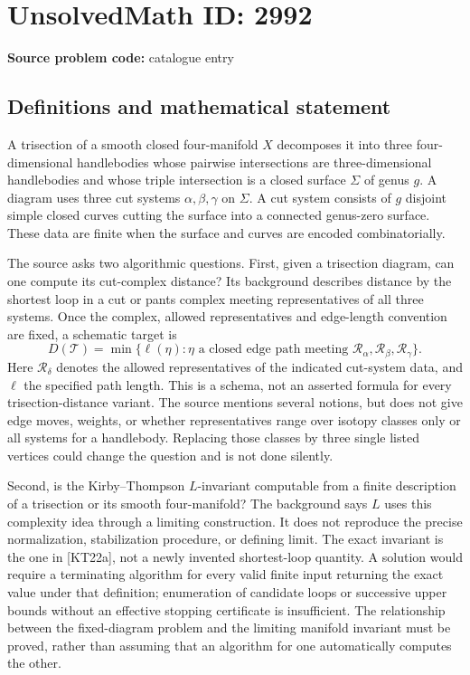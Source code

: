 \documentclass[11pt]{article}
\begin{document}
\section*{UnsolvedMath ID: 2992}
\textbf{Source problem code:} catalogue entry
\subsection{Definitions and mathematical statement}
A trisection of a smooth closed four-manifold $X$ decomposes it into three four-dimensional handlebodies whose pairwise intersections are three-dimensional handlebodies and whose triple intersection is a closed surface $\Sigma$ of genus $g$. A diagram uses three cut systems $\alpha,\beta,\gamma$ on $\Sigma$. A cut system consists of $g$ disjoint simple closed curves cutting the surface into a connected genus-zero surface. These data are finite when the surface and curves are encoded combinatorially.

The source asks two algorithmic questions. First, given a trisection diagram, can one compute its cut-complex distance? Its background describes distance by the shortest loop in a cut or pants complex meeting representatives of all three systems. Once the complex, allowed representatives and edge-length convention are fixed, a schematic target is
\[
 D(\mathcal T)=\min\{\ell(\eta):\eta\text{ a closed edge path meeting }
                  \mathcal R_\alpha,\mathcal R_\beta,\mathcal R_\gamma\}.
\]
Here $\mathcal R_\delta$ denotes the allowed representatives of the indicated cut-system data, and $\ell$ the specified path length. This is a schema, not an asserted formula for every trisection-distance variant. The source mentions several notions, but does not give edge moves, weights, or whether representatives range over isotopy classes only or all systems for a handlebody. Replacing those classes by three single listed vertices could change the question and is not done silently.

Second, is the Kirby--Thompson $L$-invariant computable from a finite description of a trisection or its smooth four-manifold? The background says $L$ uses this complexity idea through a limiting construction. It does not reproduce the precise normalization, stabilization procedure, or defining limit. The exact invariant is the one in [KT22a], not a newly invented shortest-loop quantity. A solution would require a terminating algorithm for every valid finite input returning the exact value under that definition; enumeration of candidate loops or successive upper bounds without an effective stopping certificate is insufficient. The relationship between the fixed-diagram problem and the limiting manifold invariant must be proved, rather than assuming that an algorithm for one automatically computes the other.
\end{document}
